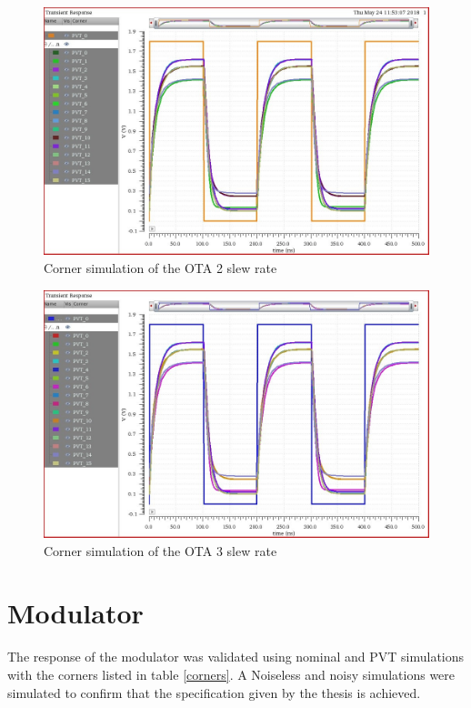 \begin{figure}[H]
\centering
\includegraphics[width=\textwidth]{images/corner_slew_rate_2.jpg}
\caption{Corner simulation of the OTA 2 slew rate}
\label{corner_slew_2}
\end{figure}

\begin{figure}[H]
\centering
\includegraphics[width=\textwidth]{images/corner_slew_rate_3.jpg}
\caption{Corner simulation of the OTA 3 slew rate}
\label{corner_slew_3}
\end{figure}

\section{Modulator}
The response of the modulator was validated using nominal and PVT simulations with the corners listed in table \ref{corners}. A Noiseless and noisy simulations were simulated to confirm that the specification given by the thesis is achieved.  

